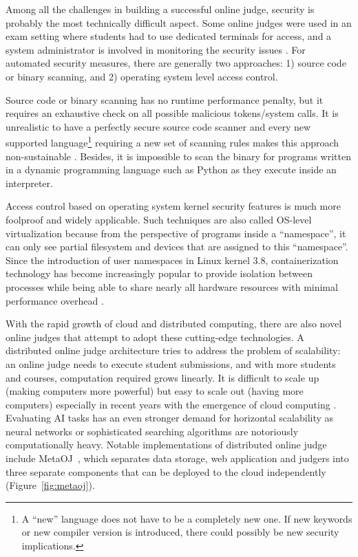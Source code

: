 Among all the challenges in building a successful online judge, security is probably the most technically difficult aspect. Some online judges were used in an exam setting where students had to use dedicated terminals for access, and a system administrator is involved in monitoring the security issues \cite{10.1145/384267.305835}. For automated security measures, there are generally two approaches: 1) source code or binary scanning, and 2) operating system level access control. 

Source code or binary scanning has no runtime performance penalty, but it requires an exhaustive check on all possible malicious tokens/system calls. It is unrealistic to have a perfectly secure source code scanner and every new supported language\footnote{A “new” language does not have to be a completely new one. If new keywords or new compiler version is introduced, there could possibly be new security implications.} requiring a new set of scanning rules makes this approach non-sustainable \cite{RN4}. Besides, it is impossible to scan the binary for programs written in a dynamic programming language such as Python as they execute inside an interpreter.

Access control based on operating system kernel security features is much more foolproof and widely applicable. Such techniques are also called OS-level virtualization because from the perspective of programs inside a ``namespace'', it can only see partial filesystem and devices that are assigned to this “namespace”. Since the introduction of user namespaces in Linux kernel 3.8, containerization technology has become increasingly popular to provide isolation between processes while being able to share nearly all hardware resources with minimal performance overhead \cite{RN16}. 

With the rapid growth of cloud and distributed computing, there are also novel online judges that attempt to adopt these cutting-edge technologies. A distributed online judge architecture tries to address the problem of scalability: an online judge needs to execute student submissions, and with more students and courses, computation required grows linearly. It is difficult to scale up (making computers more powerful) but easy to scale out (having more computers) especially in recent years with the emergence of cloud computing \cite{RN17}. Evaluating AI tasks has an even stronger demand for horizontal scalability as neural networks or sophisticated searching algorithms are notoriously computationally heavy. Notable implementations of distributed online judge include MetaOJ~\cite{metaoj}, which separates data storage, web application and judgers into three separate components that can be deployed to the cloud independently (Figure~\ref{fig:metaoj}).

